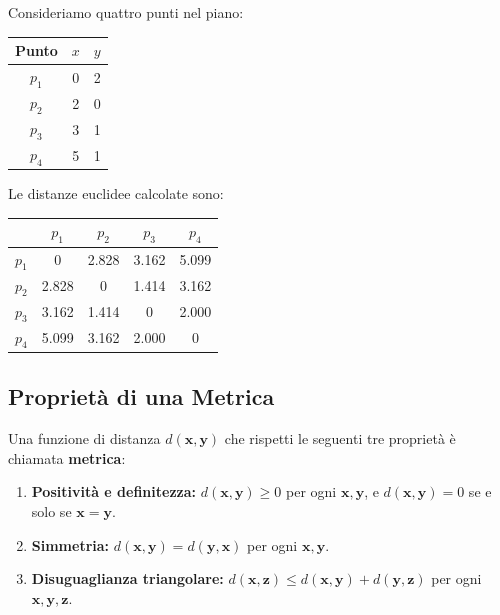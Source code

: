 \begin{example}
Consideriamo quattro punti nel piano:

\begin{center}
\begin{tabularx}{0.4\textwidth}{c c c}
\toprule
Punto & $x$ & $y$ \\
\midrule
$p_1$ & 0 & 2 \\
$p_2$ & 2 & 0 \\
$p_3$ & 3 & 1 \\
$p_4$ & 5 & 1 \\
\bottomrule
\end{tabularx}
\end{center}

Le distanze euclidee calcolate sono:

\begin{center}
\begin{tabular}{c | c c c c}
\toprule
 & $p_1$ & $p_2$ & $p_3$ & $p_4$ \\
\midrule
$p_1$ & 0 & 2.828 & 3.162 & 5.099 \\
$p_2$ & 2.828 & 0 & 1.414 & 3.162 \\
$p_3$ & 3.162 & 1.414 & 0 & 2.000 \\
$p_4$ & 5.099 & 3.162 & 2.000 & 0 \\
\bottomrule
\end{tabular}
\end{center}
\end{example}

\subsection{Proprietà di una Metrica}

Una funzione di distanza $d(\mathbf{x}, \mathbf{y})$ che rispetti le seguenti tre proprietà è chiamata \textbf{metrica}:

\begin{enumerate}
  \item \textbf{Positività e definitezza:} $d(\mathbf{x}, \mathbf{y}) \geq 0$ per ogni $\mathbf{x}, \mathbf{y}$, e $d(\mathbf{x}, \mathbf{y}) = 0$ se e solo se $\mathbf{x} = \mathbf{y}$.
  \item \textbf{Simmetria:} $d(\mathbf{x}, \mathbf{y}) = d(\mathbf{y}, \mathbf{x})$ per ogni $\mathbf{x}, \mathbf{y}$.
  \item \textbf{Disuguaglianza triangolare:} $d(\mathbf{x}, \mathbf{z}) \leq d(\mathbf{x}, \mathbf{y}) + d(\mathbf{y}, \mathbf{z})$ per ogni $\mathbf{x}, \mathbf{y}, \mathbf{z}$.
\end{enumerate}

